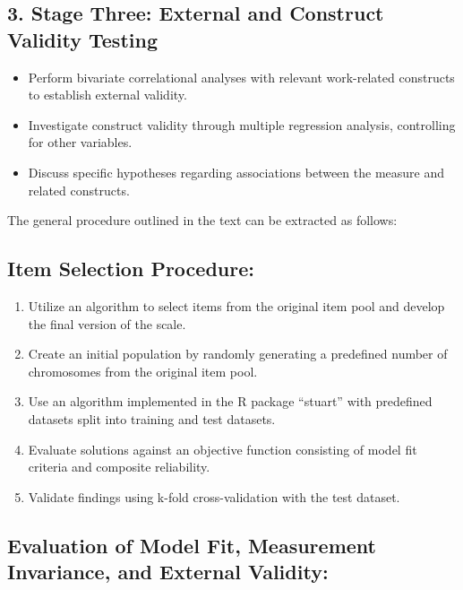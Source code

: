 \documentclass[
  12pt,
  a4paper,
  twoside]{article}
\providecommand{\tightlist}{%
  \setlength{\itemsep}{0pt}\setlength{\parskip}{0pt}}
\begin{document}
\hypertarget{stage-three-external-and-construct-validity-testing}{%
\subsection{3. Stage Three: External and Construct Validity Testing}\label{stage-three-external-and-construct-validity-testing}}

\begin{itemize}
\tightlist
\item
  Perform bivariate correlational analyses with relevant work-related constructs to establish external validity.
\item
  Investigate construct validity through multiple regression analysis, controlling for other variables.
\item
  Discuss specific hypotheses regarding associations between the measure and related constructs.
\end{itemize}

The general procedure outlined in the text can be extracted as follows:

\hypertarget{item-selection-procedure}{%
\subsection{Item Selection Procedure:}\label{item-selection-procedure}}

\begin{enumerate}
\def\labelenumi{\arabic{enumi}.}
\tightlist
\item
  Utilize an algorithm to select items from the original item pool and develop the final version of the scale.
\item
  Create an initial population by randomly generating a predefined number of chromosomes from the original item pool.
\item
  Use an algorithm implemented in the R package ``stuart'' with predefined datasets split into training and test datasets.
\item
  Evaluate solutions against an objective function consisting of model fit criteria and composite reliability.
\item
  Validate findings using k-fold cross-validation with the test dataset.
\end{enumerate}

\hypertarget{evaluation-of-model-fit-measurement-invariance-and-external-validity}{%
\subsection{Evaluation of Model Fit, Measurement Invariance, and External Validity:}\label{evaluation-of-model-fit-measurement-invariance-and-external-validity}}
\end{document}
